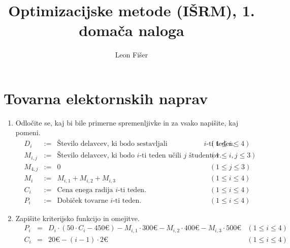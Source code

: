 \documentclass{article}
\title{Optimizacijske metode (IŠRM), 1. domača naloga}
\author{Leon Fišer}
\newcommand{\euro}{\text{€}}
\begin{document}
\maketitle

\section{Tovarna elektornskih naprav}

\begin{enumerate}[label=\alph*)]
\item 
    Odločite se, kaj bi bile primerne spremenljivke in za vsako napišite, kaj pomeni.
    $$
        \begin{array}{lllll}
            & D_i     & := & \text{Število delavcev, ki bodo sestavljali sprejemnike $i$-ti teden. } & (1 \leq i \leq 4)\\
            & M_{i,j} & := & \text{Število delavcev, ki bodo $i$-ti teden učili $j$ študentov. } & (1 \leq i,j \leq 3)\\
            & M_{4,j} & := & 0 & (1 \leq j \leq 3)\\
            & M_{i}   & := & M_{i,1} + M_{i,2} + M_{i,3} & (1 \leq i \leq 4) \\
            & C_i     & := & \text{Cena enega radija $i$-ti teden. } & (1 \leq i \leq 4) \\
            & P_i     & := & \text{Dobiček tovarne $i$-ti teden.} & (1 \leq i \leq 4)
        \end{array}
    $$

\item Zapišite kriterijsko funkcijo in omejitve.
    $$
        \begin{array}{lllll}
            & P_i     & = & D_i \cdot (50 \cdot C_i - 450 \euro ) - M_{i,1} \cdot 300 \euro - M_{i,2} \cdot 400 \euro - M_{i,3} \cdot 500 \euro & (1 \leq i \leq 4) \\
            & C_i     & = & 20 \euro - (i - 1)\cdot 2 \euro & (1 \leq i \leq 4)
        \end{array}
    $$
    

\end{enumerate}
\end{document}
